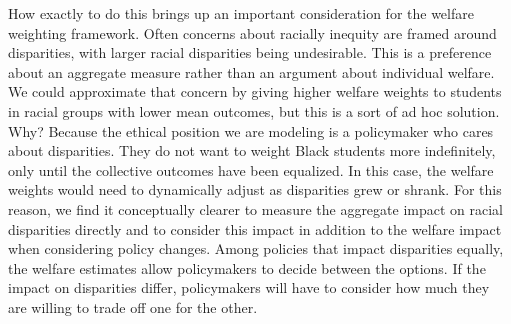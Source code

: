 \documentclass[12pt]{article}
\theoremstyle{definition}
\theoremstyle{definition}
\theoremstyle{definition}
\theoremstyle{definition}
\newtheorem{thm}{Theorem}
\begin{document}
    How exactly to do this brings up an important consideration for the welfare weighting framework. Often concerns about racially inequity are framed around disparities, with larger racial disparities being undesirable. This is a preference about an aggregate measure rather than an argument about individual welfare. We could approximate that concern by giving higher welfare weights to students in racial groups with lower mean outcomes, but this is a sort of ad hoc solution. Why? Because the ethical position we are modeling is a policymaker who cares about disparities. They do not want to weight Black students more indefinitely, only until the collective outcomes have been equalized. In this case, the welfare weights would need to dynamically adjust as disparities grew or shrank. For this reason, we find it conceptually clearer to measure the aggregate impact on racial disparities directly and to consider this impact in addition to the welfare impact when considering policy changes. Among policies that impact disparities equally, the welfare estimates allow policymakers to decide between the options. If the impact on disparities differ, policymakers will have to consider how much they are willing to trade off one for the other.      

    
    
\end{document}
